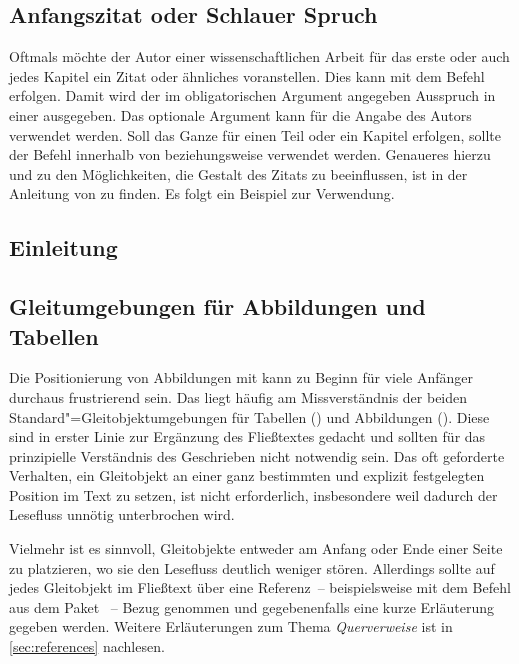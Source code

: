 \documentclass[%
  english,ngerman,%
  geometry=no,DIV=12,automark,%
]{tudscrartcl}
\begin{document}
\section{Anfangszitat oder Schlauer Spruch}
\renewcommand*\dictumwidth{.4\textwidth}%
%
\bigskip\noindent
Oftmals möchte der Autor einer wissenschaftlichen Arbeit für das erste oder 
auch jedes Kapitel ein Zitat oder ähnliches voranstellen. Dies kann mit dem 
Befehl  erfolgen. Damit wird 
der im obligatorischen Argument angegeben Ausspruch in einer  
ausgegeben. Das optionale Argument kann für die Angabe des Autors verwendet 
werden. Soll das Ganze für einen Teil oder ein Kapitel erfolgen, sollte der 
Befehl  innerhalb von  beziehungsweise 
 verwendet werden. Genaueres hierzu und zu den 
Möglichkeiten, die Gestalt des Zitats zu beeinflussen, ist in der Anleitung von 
\KOMAScript{} \scrguide zu finden. Es folgt ein Beispiel zur Verwendung.
%
\begin{Hint}
\chapter{Einleitung}

\end{Hint}



\section{Gleitumgebungen für Abbildungen und Tabellen}
\label{sec:floats}
Die Positionierung von Abbildungen mit  kann zu Beginn für viele 
Anfänger durchaus frustrierend sein. Das liegt häufig am Missverständnis der 
beiden Standard"=Gleitobjektumgebungen für Tabellen () und 
Abbildungen (). Diese sind in erster Linie zur Ergänzung 
des Fließtextes gedacht und sollten für das prinzipielle Verständnis des 
Geschrieben nicht notwendig sein. Das oft geforderte Verhalten, ein Gleitobjekt 
an einer ganz bestimmten und explizit festgelegten Position im Text zu setzen, 
ist nicht erforderlich, insbesondere weil dadurch der Lesefluss unnötig 
unterbrochen wird. 

Vielmehr ist es sinnvoll, Gleitobjekte entweder am Anfang oder Ende einer Seite 
zu platzieren, wo sie den Lesefluss deutlich weniger stören. Allerdings sollte 
auf jedes Gleitobjekt im Fließtext über eine Referenz~-- beispielsweise mit dem 
Befehl  aus dem Paket ~-- Bezug genommen und 
gegebenenfalls eine kurze Erläuterung gegeben werden. Weitere Erläuterungen zum 
Thema \emph{Querverweise} ist in \autoref{sec:references} nachlesen.
\end{document}
